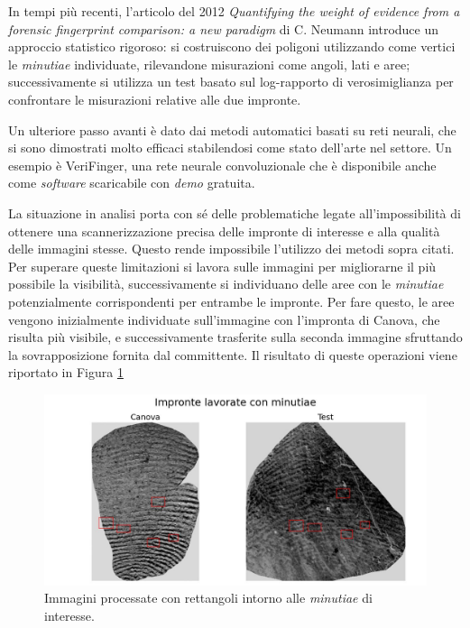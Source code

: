 \documentclass[12pt]{article}
\begin{document}
In tempi più recenti, l'articolo del 2012 \emph{Quantifying the weight of evidence from a forensic fingerprint comparison: a new paradigm} di C. Neumann introduce un approccio statistico rigoroso: si costruiscono dei poligoni utilizzando come vertici le \emph{minutiae} individuate, rilevandone misurazioni come angoli, lati e aree; successivamente si utilizza un test basato sul log-rapporto di verosimiglianza per confrontare le misurazioni relative alle due impronte.

Un ulteriore passo avanti è dato dai metodi automatici basati su reti neurali, che si sono dimostrati molto efficaci stabilendosi come stato dell'arte nel settore. Un esempio è VeriFinger, una rete neurale convoluzionale che è disponibile anche come \emph{software} scaricabile con \emph{demo} gratuita.

La situazione in analisi porta con sé delle problematiche legate all'impossibilità di ottenere una scannerizzazione precisa delle impronte di interesse e alla qualità delle immagini stesse. Questo rende impossibile l'utilizzo dei metodi sopra citati. Per superare queste limitazioni si lavora sulle immagini per migliorarne il più possibile la visibilità, successivamente si individuano delle aree con le \emph{minutiae} potenzialmente corrispondenti per entrambe le impronte. Per fare questo, le aree vengono inizialmente individuate sull'immagine con l'impronta di Canova, che risulta più visibile, e successivamente trasferite sulla seconda immagine sfruttando la sovrapposizione fornita dal committente. Il risultato di queste operazioni viene riportato in Figura \ref{fig:boxed_fp}

\begin{figure}[!htb]
    \centering
    \includegraphics[width=1.0\textwidth]{figures/boxed_fingerprints.jpg}
    \caption{Immagini processate con rettangoli intorno alle \emph{minutiae} di interesse.}
    \label{fig:boxed_fp}
\end{figure}
\end{document}
